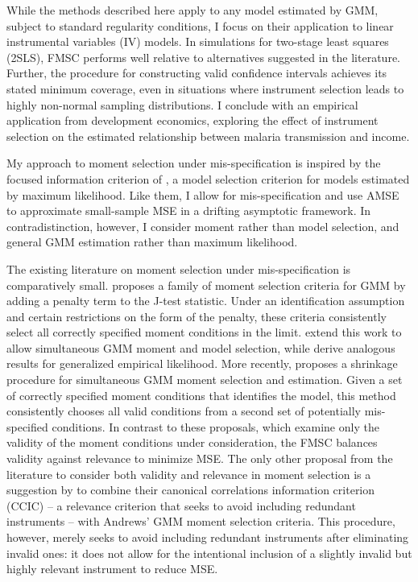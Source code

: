 \documentclass[12pt]{article}
\theoremstyle{definition}
\begin{document}
While the methods described here apply to any model estimated by GMM, subject to standard regularity conditions, I focus on their application to linear instrumental variables (IV) models. In simulations for two-stage least squares (2SLS), FMSC performs well relative to alternatives suggested in the literature. Further, the procedure for constructing valid confidence intervals achieves its stated minimum coverage, even in situations where instrument selection leads to highly non-normal sampling distributions. I conclude with an empirical application from development economics, exploring the effect of instrument selection on the estimated relationship between malaria transmission and income. 

My approach to moment selection under mis-specification is inspired by the focused information criterion of \citet{ClaeskensHjort2003}, a model selection criterion for models estimated by maximum likelihood. Like them, I allow for mis-specification and use AMSE to approximate small-sample MSE in a drifting asymptotic framework. In contradistinction, however, I consider moment rather than model selection, and general GMM estimation rather than maximum likelihood.
 
The existing literature on moment selection under mis-specification is comparatively small. \cite{Andrews1999} proposes a family of moment selection criteria for GMM by adding a penalty term to the J-test statistic. Under an identification assumption and certain restrictions on the form of the penalty, these criteria consistently select all correctly specified moment conditions in the limit. \cite{AndrewsLu} extend this work to allow simultaneous GMM moment and model selection, while \cite{HongPrestonShum} derive analogous results for generalized empirical likelihood. More recently, \cite{Liao} proposes a shrinkage procedure for simultaneous GMM moment selection and estimation. Given a set of correctly specified moment conditions that identifies the model, this method consistently chooses all valid conditions from a second set of potentially mis-specified conditions. In contrast to these proposals, which examine only the validity of the moment conditions under consideration, the FMSC balances validity against relevance to minimize MSE. The only other proposal from the literature to consider both validity and relevance in moment selection is a suggestion by \cite{HallPeixe2003} to combine their canonical correlations information criterion (CCIC) -- a relevance criterion that seeks to avoid including redundant instruments -- with Andrews' GMM moment selection criteria. This procedure, however, merely seeks to avoid including redundant instruments after eliminating invalid ones: it does not allow for the intentional inclusion of a slightly invalid but highly relevant instrument to reduce MSE. 
\end{document}
